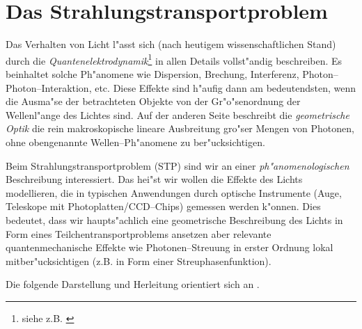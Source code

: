 	\chapter{Das Strahlungstransportproblem}
	\label{sec:radiative_transfer}
	
	Das Verhalten von Licht l"asst sich (nach heutigem wissenschaftlichen Stand) durch die {\em Quantenelektrodynamik}\footnote{siehe z.B. \citet{Feynman:1990p11684}} in allen Details vollst"andig beschreiben. Es beinhaltet solche Ph"anomene wie Dispersion, Brechung, Interferenz, Photon--Photon--Interaktion, etc. Diese Effekte sind h"aufig dann am bedeutendsten, wenn die Ausma"se der betrachteten Objekte von der Gr"o"senordnung der Wellenl"ange des Lichtes sind. Auf der anderen Seite beschreibt die {\em geometrische Optik} die rein makroskopische lineare Ausbreitung gro"ser Mengen von Photonen, ohne obengenannte Wellen--Ph"anomene zu ber"ucksichtigen.
	
	Beim Strahlungstransportproblem (STP) sind wir an einer {\em ph"anomenologischen} Beschreibung interessiert. Das hei"st wir wollen die Effekte des Lichts modellieren, die in typischen Anwendungen durch optische Instrumente (Auge, Teleskope mit Photoplatten/CCD--Chips) gemessen werden k"onnen. Dies bedeutet, dass wir haupts"achlich eine geometrische Beschreibung des Lichts in Form eines Teilchentransportproblems ansetzen aber relevante quantenmechanische Effekte wie Photonen--Streuung in erster Ordnung lokal mitber"ucksichtigen (z.B. in Form einer Streuphasenfunktion).
	
	Die folgende Darstellung und Herleitung orientiert sich an \citep{Arvo:1993p9035}.
	
